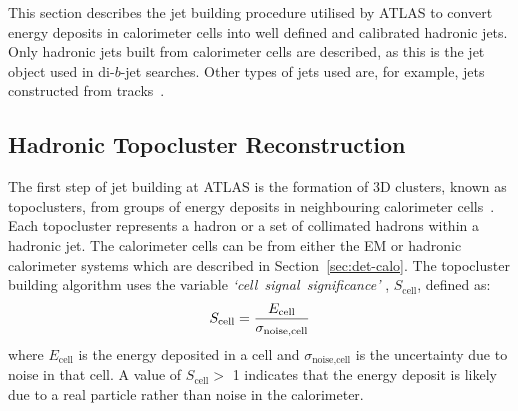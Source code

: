 This section describes the jet building procedure utilised by ATLAS
to convert energy deposits in calorimeter cells into well defined and calibrated hadronic jets.
Only hadronic jets built from calorimeter cells are described,
as this is the jet object used in di-$b$-jet searches.
Other types of jets used %
are, for example, jets constructed from tracks~\cite{obj-Hbb_exotic}.

\subsection{Hadronic Topocluster Reconstruction}
\label{sec:obj-jets_topo}

The first step of jet building at ATLAS is the formation of 3D clusters, known as topoclusters, from groups of energy deposits in neighbouring calorimeter cells~\cite{obj-jets_topo}.
Each topocluster represents a hadron or a set of collimated hadrons within a hadronic jet.
The calorimeter cells can be from either the EM or hadronic calorimeter systems which are described in Section~\ref{sec:det-calo}.
The topocluster building algorithm uses the variable \mbox{\textit{`cell signal significance'}}
, $S_{\text{cell}}$, defined as:
\begin{equation}
  \vspace{0.2em}
  {S_{\text{cell}} = \frac{E_{\text{cell}}}{\sigma_{\text{noise,cell}}}}
\end{equation}
where $E_{\text{cell}}$ is the energy deposited in a cell
and $\sigma_{\text{noise,cell}}$ is the uncertainty due to noise in that cell.
A value of $S_{\text{cell}} >$ 1 indicates that the energy deposit is likely due to a real particle rather than noise in the calorimeter.

